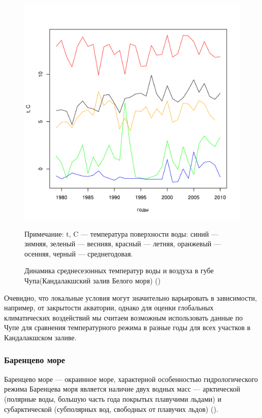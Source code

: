 	\begin{figure}
    \includegraphics[width=\textwidth]{../White_Sea/temperature_Kartesh/t_mean_season_year1.pdf}
    \caption{Динамика среднесезонных температур воды и воздуха в губе Чупа(Кандалакшский залив Белого моря) (\cite{Berger_et_al_2003})}

{\footnotesize Примечание: t, C --- температура поверхности воды: синий --- зимняя, зеленый --- веснняя, красный --- летняя, оранжевый --- осенняя, черный --- среднегодовая. }
    \label{ris:White_temp_seasons_dynamic}
	\end{figure}

Очевидно, что локальные условия могут значительно варьировать в зависимости, например, от закрытости акватории, однако для оценки глобальных климатических воздействий мы считаем возможным использовать данные по Чупе для сравнения температурного режима в разные годы для всех участков в Кандалакшском заливе.




	\subsubsection{Баренцево море}

Баренцево море --- окраинное море, характерной особенностью гидрологического режима Баренцева моря является наличие двух  водных масс --- арктической (полярные воды, большую часть года покрытых плавучими льдами) и субарктической (субполярных вод, свободных от плавучих льдов) (\cite{Adrov_1992}). 

